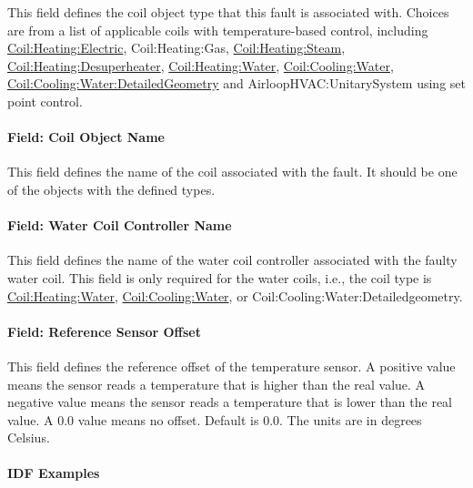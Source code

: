 This field defines the coil object type that this fault is associated with. Choices are from a list of applicable coils with temperature-based control, including \hyperref[coilheatingelectric]{Coil:Heating:Electric}, Coil:Heating:Gas, \hyperref[coilheatingsteam]{Coil:Heating:Steam}, \hyperref[coilheatingdesuperheater]{Coil:Heating:Desuperheater}, \hyperref[coilheatingwater]{Coil:Heating:Water}, \hyperref[coilcoolingwater]{Coil:Cooling:Water}, \hyperref[coilcoolingwaterdetailedgeometry]{Coil:Cooling:Water:DetailedGeometry} and AirloopHVAC:UnitarySystem using set point control.

\paragraph{Field: Coil Object Name}\label{field-coil-object-name}

This field defines the name of the coil associated with the fault. It should be one of the objects with the defined types.

\paragraph{Field: Water Coil Controller Name}\label{field-water-coil-controller-name}

This field defines the name of the water coil controller associated with the faulty water coil. This field is only required for the water coils, i.e., the coil type is \hyperref[coilheatingwater]{Coil:Heating:Water}, \hyperref[coilcoolingwater]{Coil:Cooling:Water}, or Coil:Cooling:Water:Detailedgeometry.

\paragraph{Field: Reference Sensor Offset}\label{field-reference-sensor-offset}

This field defines the reference offset of the temperature sensor. A positive value means the sensor reads a temperature that is higher than the real value. A negative value means the sensor reads a temperature that is lower than the real value. A 0.0 value means no offset. Default is 0.0. The units are in degrees Celsius.

\paragraph{IDF Examples}

